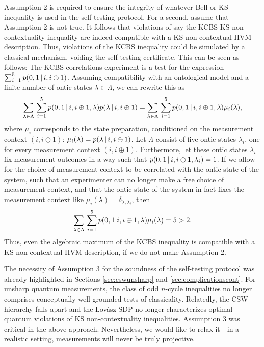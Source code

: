 Assumption 2 is required to ensure the integrity of whatever Bell or KS inequality is used in the self-testing protocol. For a second, assume that Assumption 2 is not true. It follows that violations of say the KCBS KS non-contextuality inequality are indeed compatible with a KS non-contextual HVM description. Thus, violations of the KCBS inequality could be simulated by a classical mechanism, voiding the self-testing certificate. This can be seen as follows:
The KCBS correlations experiment is a test for the expression $\sum_{i=1}^5 p(0,1\thinspace\vert\thinspace i,i\oplus1)$. Assuming compatibility with an ontological model and a finite number of ontic states $\lambda\in\Lambda$, we can rewrite this as \begin{align*}
\sum_{\lambda\in\Lambda}\thinspace\sum_{i=1}^5 p(0,1\thinspace\vert\thinspace i,i\oplus1,\lambda) p(\lambda\thinspace\vert\thinspace i,i\oplus 1)=\sum_{\lambda\in\Lambda}\thinspace\sum_{i=1}^5 p(0,1\thinspace\vert\thinspace i,i\oplus1,\lambda)\mu_i(\lambda),
\end{align*} where $\mu_i$ corresponds to the state preparation, conditioned on the measurement context $(i,i\oplus 1)$: $\mu_i(\lambda)=p(\lambda\thinspace\vert\thinspace i,i\oplus 1)$. Let $\Lambda$ consist of five ontic states $\lambda_i$, one for every measurement context $(i,i\oplus 1)$. Furthermore, let these ontic states $\lambda_i$ fix measurement outcomes in a way such that $p(0,1\thinspace\vert\thinspace i,i\oplus 1 ,\lambda_i)=1$. If we allow for the choice of measurement context to be correlated with the ontic state of the system, such that an experimenter can no longer make a free choice of measurement context, and that the ontic state of the system in fact fixes the measurement context like $\mu_i(\lambda)=\delta_{\lambda,\lambda_i}$, then
\begin{equation*}
    \sum_{\lambda\in\Lambda}\thinspace\sum_{i=1}^5 p(0,1\vert i,i\oplus1,\lambda)\mu_i(\lambda)=5>2.
\end{equation*}
Thus, even the algebraic maximum of the KCBS inequality is compatible with a KS non-contextual HVM description, if we do not make Assumption 2.

The necessity of Assumption 3 for the soundness of the self-testing protocol was already highlighted in Sections \ref{sec:cswunsharp} and \ref{sec:complicationscont}. For unsharp quantum measurements, the class of odd $n$-cycle inequalities no longer comprises conceptually well-grounded tests of classicality. Relatedly, the CSW hierarchy falls apart and the Lovász SDP no longer characterizes optimal quantum violations of KS non-contextuality inequalities. Assumption 3 was critical in the above approach. Nevertheless, we would like to relax it - in a realistic setting, measurements will never be truly projective.

